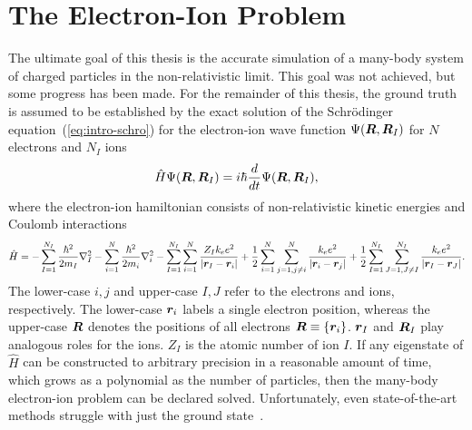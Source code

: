 \section{The Electron-Ion Problem}
The ultimate goal of this thesis is the accurate simulation of a many-body system of charged particles in the non-relativistic limit.
This goal was not achieved, but some progress has been made.
For the remainder of this thesis, the ground truth is assumed to be established by the exact solution of the Schr\"odinger equation~(\ref{eq:intro-schro}) for the electron-ion wave function $\Psi(\boldsymbol{R},\boldsymbol{R}_I)$ for $N$ electrons and $N_I$ ions
\begin{align} \label{eq:intro-schro}
\hat{H} \Psi(\boldsymbol{R},\boldsymbol{R}_I) = i\hbar\frac{d}{dt}\Psi(\boldsymbol{R},\boldsymbol{R}_I),
\end{align}
where the electron-ion hamiltonian consists of non-relativistic kinetic energies and Coulomb interactions
\begin{align} \label{eq:intro-ei-ham}
\hat{H} =
-\sum\limits_{I=1}^{N_I} \frac{\hbar^2}{2m_I} \nabla^2_I
-\sum\limits_{i=1}^N \frac{\hbar^2}{2m_i}\nabla^2_i
-\sum\limits_{I=1}^{N_I}\sum\limits_{i=1}^N
\frac{Z_Ik_ee^2}{\vert\boldsymbol{r}_I-\boldsymbol{r}_i\vert}
+\frac{1}{2}\sum\limits_{i=1}^N\sum\limits_{j=1,j\neq i}^{N} \frac{k_ee^2}{\vert\boldsymbol{r}_i-\boldsymbol{r}_j\vert}
+\frac{1}{2}\sum\limits_{I=1}^{N_I}\sum\limits_{J=1,J\neq I}^{N_I} \frac{k_ee^2}{\vert\boldsymbol{r}_I-\boldsymbol{r}_J\vert}.
\end{align}
The lower-case $i,j$ and upper-case $I,J$ refer to the electrons and ions, respectively. The lower-case $\boldsymbol{r}_i$ labels a single electron position, whereas the upper-case $\boldsymbol{R}$ denotes the positions of all electrons $\boldsymbol{R}\equiv\{\boldsymbol{r}_i\}$. $\boldsymbol{r}_I$ and $\boldsymbol{R}_I$ play analogous roles for the ions. $Z_I$ is the atomic number of ion $I$. If any eigenstate of $\hat{H}$ can be constructed to arbitrary precision in a reasonable amount of time, which grows as a polynomial as the number of particles, then the many-body electron-ion problem can be declared solved. Unfortunately, even state-of-the-art methods struggle with just the ground state~\cite{Azadi2014,McMinis2015,Drummond2015}.

